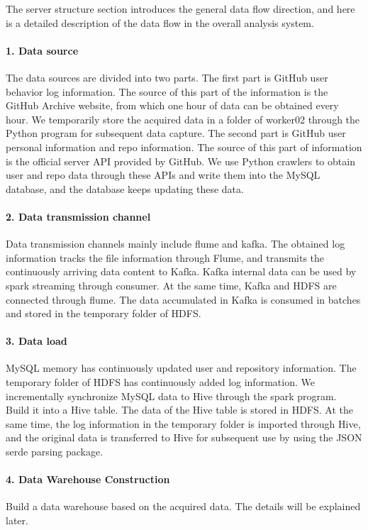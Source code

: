 The server structure section introduces the general data flow direction, and here is a detailed description of the data flow in the overall analysis system.

\paragraph*{1. Data source}
The data sources are divided into two parts.
The first part is GitHub user behavior log information. The source of this part of the information is the GitHub Archive website, from which one hour of data can be obtained every hour. We temporarily store the acquired data in a folder of worker02 through the Python program for subsequent data capture.
The second part is GitHub user personal information and repo information. The source of this part of information is the official server API provided by GitHub. We use Python crawlers to obtain user and repo data through these APIs and write them into the MySQL database, and the database keeps updating these data.

\paragraph*{2. Data transmission channel}
Data transmission channels mainly include flume and kafka.
The obtained log information tracks the file information through Flume, and transmits the continuously arriving data content to Kafka. Kafka internal data can be used by spark streaming through consumer. At the same time, Kafka and HDFS are connected through flume. The data accumulated in Kafka is consumed in batches and stored in the temporary folder of HDFS.

\paragraph*{3. Data load}
MySQL memory has continuously updated user and repository information. The temporary folder of HDFS has continuously added log information. We incrementally synchronize MySQL data to Hive through the spark program. Build it into a Hive table. The data of the Hive table is stored in HDFS.
At the same time, the log information in the temporary folder is imported through Hive, and the original data is transferred to Hive for subsequent use by using the JSON serde parsing package.

\paragraph*{4. Data Warehouse Construction}
Build a data warehouse based on the acquired data. The details will be explained later.

